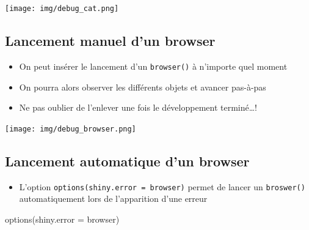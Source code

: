 \documentclass[
]{article}
\newenvironment{Shaded}{\begin{snugshade}}{\end{snugshade}}
\newcommand{\AttributeTok}[1]{\textcolor[rgb]{0.77,0.63,0.00}{#1}}
\newcommand{\CommentTok}[1]{\textcolor[rgb]{0.56,0.35,0.01}{\textit{#1}}}
\newcommand{\FunctionTok}[1]{\textcolor[rgb]{0.00,0.00,0.00}{#1}}
\newcommand{\NormalTok}[1]{#1}
\newcommand{\OtherTok}[1]{\textcolor[rgb]{0.56,0.35,0.01}{#1}}
\newcommand{\SpecialCharTok}[1]{\textcolor[rgb]{0.00,0.00,0.00}{#1}}
\providecommand{\tightlist}{%
  \setlength{\itemsep}{0pt}\setlength{\parskip}{0pt}}
\begin{document}
\texttt{[image: img/debug\_cat.png]}

\hypertarget{lancement-manuel-dun-browser}{%
\subsection{Lancement manuel d'un
browser}\label{lancement-manuel-dun-browser}}

\begin{itemize}
\tightlist
\item
  On peut insérer le lancement d'un \texttt{browser()} à n'importe quel
  moment
\item
  On pourra alors observer les différents objets et avancer pas-à-pas
\end{itemize}

\begin{Shaded}
\end{Shaded}

\begin{itemize}
\tightlist
\item
  Ne pas oublier de l'enlever une fois le développement terminé\ldots!
\end{itemize}

\texttt{[image: img/debug\_browser.png]}

\hypertarget{lancement-automatique-dun-browser}{%
\subsection{Lancement automatique d'un
browser}\label{lancement-automatique-dun-browser}}

\begin{itemize}
\tightlist
\item
  L'option \texttt{options(shiny.error\ =\ browser)} permet de lancer un
  \texttt{broswer()} automatiquement lors de l'apparition d'une erreur
\end{itemize}

\begin{Shaded}
\begin{Highlighting}[]
\FunctionTok{options}\NormalTok{(}\AttributeTok{shiny.error =}\NormalTok{ browser)}
\end{Highlighting}
\end{Shaded}
\end{document}
